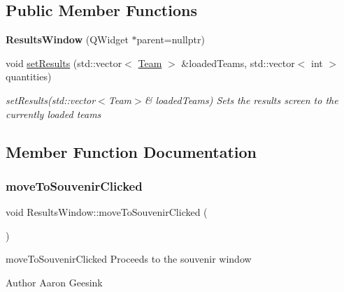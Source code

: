 \subsection*{Public Member Functions}
\begin{DoxyCompactItemize}
\item 
\mbox{\label{class_results_window_ab5eed3b399c8a305f588d4a98fb3a9ed}} 
{\bfseries Results\+Window} (Q\+Widget $\ast$parent=nullptr)
\item 
void \mbox{\hyperlink{class_results_window_a0b6b87c53306edc985aa988a6816369a}{set\+Results}} (std\+::vector$<$ \mbox{\hyperlink{class_team}{Team}} $>$ \&loaded\+Teams, std\+::vector$<$ int $>$ quantities)
\begin{DoxyCompactList}\small\item\em set\+Results(std\+::vector$<$\+Team$>$\& loaded\+Teams) Sets the results screen to the currently loaded teams \end{DoxyCompactList}\end{DoxyCompactItemize}


\subsection{Member Function Documentation}
\mbox{\label{class_results_window_aad8d4563c0f82eb6b91e90fd755532a2}} 
\subsubsection{\texorpdfstring{moveToSouvenirClicked}{moveToSouvenirClicked}}
{\footnotesize\ttfamily void Results\+Window\+::move\+To\+Souvenir\+Clicked (\begin{DoxyParamCaption}{ }\end{DoxyParamCaption})\hspace{0.3cm}{\ttfamily [signal]}}



move\+To\+Souvenir\+Clicked Proceeds to the souvenir window 

\begin{DoxyAuthor}{Author}
Aaron Geesink 
\end{DoxyAuthor}
\mbox{\label{class_results_window_ac80f4ca5ef490f18fd5cdca9defdf203}} 
